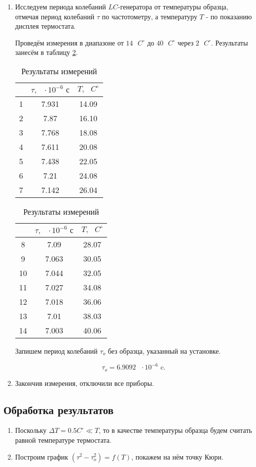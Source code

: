 \documentclass[a4paper,12pt]{article} %
\begin{document}
\begin{enumerate}
    \item Исследуем периода колебаний $LC$-генератора от температуры образца, отмечая период колебаний $\tau$ по частотометру, а температуру $T$ - по показанию дисплея термостата.

    Проведём измерения в диапазоне от $14 \text{ } C^{\circ}$ до $40 \text{ } C^{\circ}$ через $2 \text{ } C^{\circ}$. Результаты занесём в таблицу \ref{tab1}.

    \begin{table}[h]
	\centering
	\begin{tabular}{|c|c|c|}
		\hline
		& $ \tau, \text{ } \cdot 10^{-6} \text{ с}$ & $ T, \text{ } C^{\circ}$ \\ \hline
		1 & 7.931 & 14.09 \\ \hline
            2 & 7.87 & 16.10 \\ \hline
            3 & 7.768 & 18.08 \\ \hline
            4 & 7.611 & 20.08 \\ \hline
            5 & 7.438 & 22.05 \\ \hline
            6 & 7.21 & 24.08 \\ \hline
            7 & 7.142 & 26.04 \\ \hline
	\end{tabular}
        \begin{tabular}{|c|c|c|}
		\hline
		& $ \tau, \text{ } \cdot 10^{-6} \text{ с}$ & $ T, \text{ } C^{\circ}$ \\ \hline
		8 & 7.09 & 28.07 \\ \hline
            9 & 7.063 & 30.05 \\ \hline
            10 & 7.044 & 32.05 \\ \hline
            11 & 7.027 & 34.08 \\ \hline
            12 & 7.018 & 36.06 \\ \hline
            13 & 7.01 & 38.03 \\ \hline
            14 & 7.003 & 40.06 \\ \hline
	\end{tabular}
        
	\caption{Результаты измерений}
	\label{tab1}
    \end{table}

    Запишем период колебаний $\tau_{o}$ без образца, указанный на установке.

    \[ \tau_{o} = 6.9092 \text{ } \cdot 10^{-6} \text{ c.} \]

    \item Закончив измерения, отключили все приборы.
    
\end{enumerate}

\subsection{Обработка результатов}

\begin{enumerate}
    \item Поскольку $\Delta T = 0.5 C^{\circ} \ll T$, то в качестве температуры образца будем считать равной температуре термостата.

    \item Построим график $(\tau^2-\tau_{o}^2)=f(T)$, покажем на нём точку Кюри.
\end{enumerate}
\end{document}
